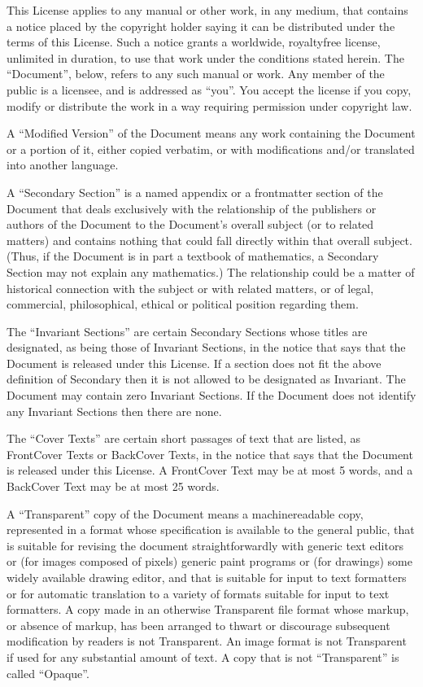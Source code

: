 \documentclass[letterpaper,10pt,english]{sphinxmanual}
\begin{document}
\sphinxAtStartPar
This License applies to any manual or other work, in any medium, that contains a notice placed by the copyright holder saying it can be distributed under the terms of this License. Such a notice grants a world\sphinxhyphen{}wide, royalty\sphinxhyphen{}free license, unlimited in duration, to use that work under the conditions stated herein. The “Document”, below, refers to any such manual or work. Any member of the public is a licensee, and is addressed as “you”. You accept the license if you copy, modify or distribute the work in a way requiring permission under copyright law.

\sphinxAtStartPar
A “Modified Version” of the Document means any work containing the Document or a portion of it, either copied verbatim, or with modifications and/or translated into another language.

\sphinxAtStartPar
A “Secondary Section” is a named appendix or a front\sphinxhyphen{}matter section of the Document that deals exclusively with the relationship of the publishers or authors of the Document to the Document’s overall subject (or to related matters) and contains nothing that could fall directly within that overall subject. (Thus, if the Document is in part a textbook of mathematics, a Secondary Section may not explain any mathematics.) The relationship could be a matter of historical connection with the subject or with related matters, or of legal, commercial, philosophical, ethical or political position regarding them.

\sphinxAtStartPar
The “Invariant Sections” are certain Secondary Sections whose titles are designated, as being those of Invariant Sections, in the notice that says that the Document is released under this License. If a section does not fit the above definition of Secondary then it is not allowed to be designated as Invariant. The Document may contain zero Invariant Sections. If the Document does not identify any Invariant Sections then there are none.

\sphinxAtStartPar
The “Cover Texts” are certain short passages of text that are listed, as Front\sphinxhyphen{}Cover Texts or Back\sphinxhyphen{}Cover Texts, in the notice that says that the Document is released under this License. A Front\sphinxhyphen{}Cover Text may be at most 5 words, and a Back\sphinxhyphen{}Cover Text may be at most 25 words.

\sphinxAtStartPar
A “Transparent” copy of the Document means a machine\sphinxhyphen{}readable copy, represented in a format whose specification is available to the general public, that is suitable for revising the document straightforwardly with generic text editors or (for images composed of pixels) generic paint programs or (for drawings) some widely available drawing editor, and that is suitable for input to text formatters or for automatic translation to a variety of formats suitable for input to text formatters. A copy made in an otherwise Transparent file format whose markup, or absence of markup, has been arranged to thwart or discourage subsequent modification by readers is not Transparent. An image format is not Transparent if used for any substantial amount of text. A copy that is not “Transparent” is called “Opaque”.
\end{document}
